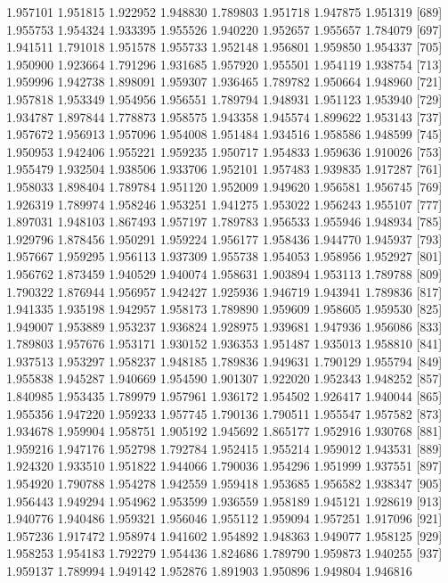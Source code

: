 \documentclass{article}
\begin{document}
\begin{Schunk}
\begin{Soutput}
 [681] 1.957101 1.951815 1.922952 1.948830 1.789803 1.951718 1.947875 1.951319
 [689] 1.955753 1.954324 1.933395 1.955526 1.940220 1.952657 1.955657 1.784079
 [697] 1.941511 1.791018 1.951578 1.955733 1.952148 1.956801 1.959850 1.954337
 [705] 1.950900 1.923664 1.791296 1.931685 1.957920 1.955501 1.954119 1.938754
 [713] 1.959996 1.942738 1.898091 1.959307 1.936465 1.789782 1.950664 1.948960
 [721] 1.957818 1.953349 1.954956 1.956551 1.789794 1.948931 1.951123 1.953940
 [729] 1.934787 1.897844 1.778873 1.958575 1.943358 1.945574 1.899622 1.953143
 [737] 1.957672 1.956913 1.957096 1.954008 1.951484 1.934516 1.958586 1.948599
 [745] 1.950953 1.942406 1.955221 1.959235 1.950717 1.954833 1.959636 1.910026
 [753] 1.955479 1.932504 1.938506 1.933706 1.952101 1.957483 1.939835 1.917287
 [761] 1.958033 1.898404 1.789784 1.951120 1.952009 1.949620 1.956581 1.956745
 [769] 1.926319 1.789974 1.958246 1.953251 1.941275 1.953022 1.956243 1.955107
 [777] 1.897031 1.948103 1.867493 1.957197 1.789783 1.956533 1.955946 1.948934
 [785] 1.929796 1.878456 1.950291 1.959224 1.956177 1.958436 1.944770 1.945937
 [793] 1.957667 1.959295 1.956113 1.937309 1.955738 1.954053 1.958956 1.952927
 [801] 1.956762 1.873459 1.940529 1.940074 1.958631 1.903894 1.953113 1.789788
 [809] 1.790322 1.876944 1.956957 1.942427 1.925936 1.946719 1.943941 1.789836
 [817] 1.941335 1.935198 1.942957 1.958173 1.789890 1.959609 1.958605 1.959530
 [825] 1.949007 1.953889 1.953237 1.936824 1.928975 1.939681 1.947936 1.956086
 [833] 1.789803 1.957676 1.953171 1.930152 1.936353 1.951487 1.935013 1.958810
 [841] 1.937513 1.953297 1.958237 1.948185 1.789836 1.949631 1.790129 1.955794
 [849] 1.955838 1.945287 1.940669 1.954590 1.901307 1.922020 1.952343 1.948252
 [857] 1.840985 1.953435 1.789979 1.957961 1.936172 1.954502 1.926417 1.940044
 [865] 1.955356 1.947220 1.959233 1.957745 1.790136 1.790511 1.955547 1.957582
 [873] 1.934678 1.959904 1.958751 1.905192 1.945692 1.865177 1.952916 1.930768
 [881] 1.959216 1.947176 1.952798 1.792784 1.952415 1.955214 1.959012 1.943531
 [889] 1.924320 1.933510 1.951822 1.944066 1.790036 1.954296 1.951999 1.937551
 [897] 1.954920 1.790788 1.954278 1.942559 1.959418 1.953685 1.956582 1.938347
 [905] 1.956443 1.949294 1.954962 1.953599 1.936559 1.958189 1.945121 1.928619
 [913] 1.940776 1.940486 1.959321 1.956046 1.955112 1.959094 1.957251 1.917096
 [921] 1.957236 1.917472 1.958974 1.941602 1.954892 1.948363 1.949077 1.958125
 [929] 1.958253 1.954183 1.792279 1.954436 1.824686 1.789790 1.959873 1.940255
 [937] 1.959137 1.789994 1.949142 1.952876 1.891903 1.950896 1.949804 1.946816

\end{Soutput}
\end{Schunk}
\end{document}
